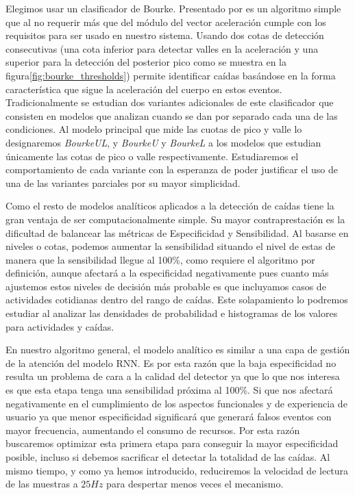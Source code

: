 Elegimos usar un clasificador de Bourke. Presentado por  es un algoritmo simple que al no requerir más que del módulo del vector aceleración cumple con los requisitos para ser usado en nuestro sistema. Usando dos cotas de detección consecutivas (una cota inferior para detectar valles en la aceleración y una superior para la detección del posterior pico como se muestra en la figura\ref{fig:bourke_thresholds}) permite identificar caídas basándose en la forma característica que sigue la aceleración del cuerpo en estos eventos. Tradicionalmente se estudian dos variantes adicionales de este clasificador que consisten en modelos que analizan cuando se dan por separado cada una de las condiciones. Al modelo principal que mide las cuotas de pico y valle lo designaremos \textit{BourkeUL}, y \textit{BourkeU} y \textit{BourkeL} a los modelos que estudian únicamente las cotas de pico o valle respectivamente. Estudiaremos el comportamiento de cada variante con la esperanza de poder justificar el uso de una de las variantes parciales por su mayor simplicidad.

Como el resto de modelos analíticos aplicados a la detección de caídas tiene la gran ventaja de ser computacionalmente simple. Su mayor contraprestación es la dificultad de balancear las métricas de Especificidad y Sensibilidad. Al basarse en niveles o cotas, podemos aumentar la sensibilidad situando el nivel de estas de manera que la sensibilidad llegue al 100\%, como requiere el algoritmo por definición, aunque afectará a la especificidad negativamente \cite{Aziz2017} pues cuanto más ajustemos estos niveles de decisión más probable es que incluyamos casos de actividades cotidianas dentro del rango de caídas. Este solapamiento lo podremos estudiar al analizar las densidades de probabilidad e histogramas de los valores para actividades y caídas.

En nuestro algoritmo general, el modelo analítico es similar a una capa de gestión de la atención del modelo RNN. Es por esta razón que la baja especificidad  no resulta un problema de cara a la calidad del detector ya que lo que nos interesa es que esta etapa tenga una sensibilidad próxima al 100\%. Si que nos afectará negativamente en el cumplimiento de los aspectos funcionales y de experiencia de usuario ya que menor especificidad significará que generará falsos eventos con mayor frecuencia, aumentando el consumo de recursos. Por esta razón buscaremos optimizar esta primera etapa para conseguir la mayor especificidad posible, incluso si debemos sacrificar el detectar la totalidad de las caídas. Al mismo tiempo, y como ya hemos introducido, reduciremos la velocidad de lectura de las muestras a $25Hz$ para despertar menos veces el mecanismo. 

